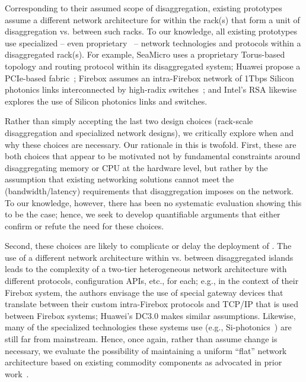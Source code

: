Corresponding to their assumed scope of disaggregation, existing prototypes assume a different network architecture for within the rack(s) that form a unit of disaggregation vs. between such racks. To our knowledge, all existing \dis prototypes use specialized -- even proprietary~\cite{seamicro,huawei,rsa} -- network technologies and protocols within a disaggregated rack(s). For example, SeaMicro uses a proprietary Torus-based topology and routing protocol within its disaggregated system; Huawei propose a PCIe-based fabric~\cite{huawei1}; Firebox assumes an intra-Firebox network of 1Tbps Silicon photonics links interconnected by high-radix switches~\cite{firebox,vladimir}; and Intel's RSA likewise explores the use of Silicon photonics links and switches. 

Rather than simply accepting the last two design choices (rack-scale disaggregation and specialized network designs), we critically explore when and why these choices are necessary. Our rationale in this is twofold. 
First, these are both choices that appear to be motivated not by fundamental constraints around disaggregating memory or CPU at the hardware level, but rather by the assumption that existing networking solutions cannot meet the (bandwidth/latency) requirements that disaggregation imposes on the network. To our knowledge, however, there has been no systematic evaluation showing this to be the case; hence, we seek to develop quantifiable arguments that either confirm or refute the need for these choices. 

Second, these choices are likely to complicate or delay the deployment of \dis. The use of a different network architecture within vs. between disaggregated islands leads to the complexity of a two-tier heterogeneous network architecture with different protocols, configuration APIs, etc., for each; e.g., in the context of their Firebox system, the authors envisage the use of special gateway devices that translate between their custom intra-Firebox protocols and TCP/IP that is used between Firebox systems; Huawei's DC3.0 makes similar assumptions. Likewise, many of the specialized technologies these systems use (e.g., Si-photonics~\cite{vladimir-nature}) are still far from mainstream. 
Hence, once again, rather than assume change is necessary, we evaluate the possibility of maintaining a uniform ``flat'' network architecture based on existing commodity components as advocated in prior work~\cite{el-fares,vl2,greenberg-costs}. 
%
%
%
